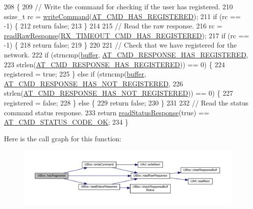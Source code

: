 \begin{DoxyCode}
208 \{
209     \textcolor{comment}{// Write the command for checking if the user has registered.}
210     ssize\_t rc = \hyperlink{class_u_blox_af604d1897a66192bf1c2a11997f2634d}{writeCommand}(\hyperlink{_u_blox_8cpp_adb3c30885c8e5a7fa3028c3c33ff46a7}{AT\_CMD\_HAS\_REGISTERED});
211     \textcolor{keywordflow}{if} (rc == -1) \{
212         \textcolor{keywordflow}{return} \textcolor{keyword}{false};
213     \}
214 
215     \textcolor{comment}{// Read the raw response.}
216     rc = \hyperlink{class_u_blox_ab4a7ab4b8922d91e23f273ae160c1bed}{readRawResponse}(\hyperlink{_u_blox_8cpp_a4cdcbb86e4e627adbcaf6ce6c5a7a07a}{RX\_TIMEOUT\_CMD\_HAS\_REGISTERED});
217     \textcolor{keywordflow}{if} (rc == -1) \{
218         \textcolor{keywordflow}{return} \textcolor{keyword}{false};
219     \}
220 
221     \textcolor{comment}{// Check that we have registered for the network.}
222     \textcolor{keywordflow}{if} (strncmp(\hyperlink{class_u_blox_a6ca4b90f3dc4e856181dce1ebda6f82c}{buffer}, \hyperlink{_u_blox_8cpp_a7992f1bd61ccf8e78586835e17c1b8e5}{AT\_CMD\_RESPONSE\_HAS\_REGISTERED},
223                 strlen(\hyperlink{_u_blox_8cpp_a7992f1bd61ccf8e78586835e17c1b8e5}{AT\_CMD\_RESPONSE\_HAS\_REGISTERED})) == 0) \{
224         registered = \textcolor{keyword}{true};
225     \} \textcolor{keywordflow}{else} \textcolor{keywordflow}{if} (strncmp(\hyperlink{class_u_blox_a6ca4b90f3dc4e856181dce1ebda6f82c}{buffer}, \hyperlink{_u_blox_8cpp_a10b9369ebc46aa9cca83e01af5ebd741}{AT\_CMD\_RESPONSE\_HAS\_NOT\_REGISTERED},
226                        strlen(\hyperlink{_u_blox_8cpp_a10b9369ebc46aa9cca83e01af5ebd741}{AT\_CMD\_RESPONSE\_HAS\_NOT\_REGISTERED})) == 0) 
      \{
227         registered = \textcolor{keyword}{false};
228     \} \textcolor{keywordflow}{else} \{
229         \textcolor{keywordflow}{return} \textcolor{keyword}{false};
230     \}
231 
232     \textcolor{comment}{// Read the status command status response.}
233     \textcolor{keywordflow}{return} \hyperlink{class_u_blox_a4eaca5b1b1c4b5b6f6164b220dd43e0b}{readStatusResponse}(\textcolor{keyword}{true}) == \hyperlink{_u_blox_8cpp_a6ebc1682eb6b9964fccb4a61688ff307}{AT\_CMD\_STATUS\_CODE\_OK};
234 \}
\end{DoxyCode}
Here is the call graph for this function\+:\nopagebreak
\begin{figure}[H]
\begin{center}
\leavevmode
\includegraphics[width=350pt]{da/df6/class_u_blox_a1889c2b9bb6087bc939bd2a27b68623b_cgraph}
\end{center}
\end{figure}
